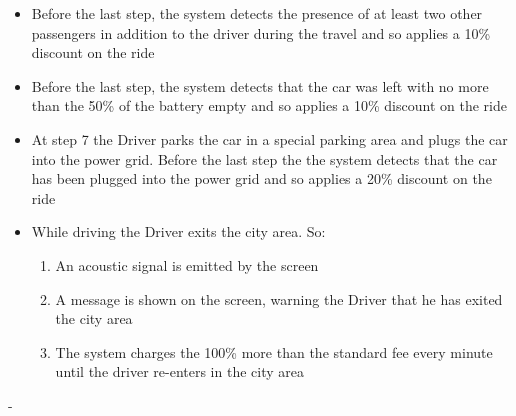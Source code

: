 {
	\begin{itemize}
	\item Before the last step, the system detects the presence of at least two other passengers in addition to the driver during the 		         travel and so applies a 10\% discount on the ride
	\item Before the last step, the system detects that the car was left with no more than the 50\% of the battery empty and so 			         applies a 10\% discount on the ride
	\item At step 7 the Driver parks the car in a special parking area and plugs the car into the power grid. Before the last step the 
	         the system detects that the car has been plugged into the power grid and so applies a 20\% discount on the ride
	\item While driving the Driver exits the city area. So:
		\begin{enumerate}
		\item An acoustic signal is emitted by the screen
		\item A message is shown on the screen, warning the Driver that he has exited the city area
		\item The system charges the 100\% more than the standard fee every minute until the driver re-enters in the city area
		\end{enumerate} 
	\end{itemize}

}
{-}






\FloatBarrier


